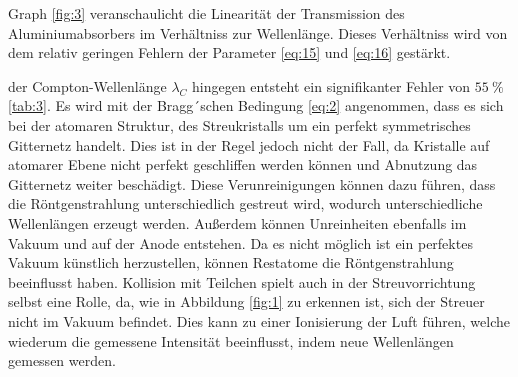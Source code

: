     \justifying Graph \ref{fig:3} veranschaulicht die Linearität der Transmission des Aluminiumabsorbers im Verhältniss zur Wellenlänge. Dieses Verhältniss
    wird von dem relativ geringen Fehlern der Parameter \eqref{eq:15} und \eqref{eq:16} gestärkt. 

    \justifying der Compton-Wellenlänge $\lambda_C$ hingegen entsteht ein signifikanter Fehler von $\SI{55}{\percent}$ \ref{tab:3}. Es wird mit der Bragg´schen Bedingung \eqref{eq:2} 
    angenommen, dass es sich bei der atomaren Struktur, des Streukristalls um ein perfekt symmetrisches Gitternetz handelt. Dies ist in der Regel jedoch nicht der Fall, da Kristalle auf atomarer
    Ebene nicht perfekt geschliffen werden können und Abnutzung das Gitternetz weiter beschädigt. Diese Verunreinigungen können dazu führen, dass die Röntgenstrahlung unterschiedlich gestreut wird, 
    wodurch unterschiedliche Wellenlängen erzeugt werden. Außerdem können Unreinheiten ebenfalls im Vakuum und auf der Anode entstehen. Da es nicht möglich ist ein perfektes Vakuum künstlich herzustellen, 
    können Restatome die Röntgenstrahlung beeinflusst haben. Kollision mit Teilchen spielt auch in der Streuvorrichtung selbst eine Rolle, da, wie in Abbildung \ref{fig:1} zu erkennen ist, sich der 
    Streuer  nicht im Vakuum befindet. Dies kann zu einer Ionisierung der Luft führen, welche wiederum die gemessene Intensität beeinflusst, indem neue Wellenlängen gemessen werden.  

\newpage
\printbibliography

